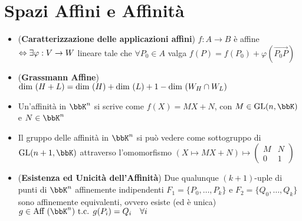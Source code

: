 \documentclass[a4paper,NoNotes,GeneralMath]{stdmdoc}
\begin{document}
	\section*{Spazi Affini e Affinità}
	\begin{itemize}
		\item ({\bf Caratterizzazione delle applicazioni affini}) $f: A \rightarrow B$ è affine $\Leftrightarrow \exists \varphi: V \rightarrow W$ lineare tale che $\forall P_0 \in A$ valga $f(P) = f(P_0) + \varphi(\overrightarrow{P_0P})$
		\item ({\bf Grassmann Affine}) $\mbox{dim }(H+L) = \mbox{dim }(H) + \mbox{dim }(L) + 1 - \mbox{dim }(W_H \cap W_L)$
		\item Un'affinità in $\bbK^n$ si scrive come $f(X) = MX+N$, con $M \in \GL(n, \bbK)$ e $N \in \bbK^n$
		\item Il gruppo delle affinità in $\bbK^n$ si può vedere come sottogruppo di $\GL(n+1, \bbK)$ attraverso l'omomorfismo $(X \mapsto MX + N) \mapsto \left( \begin{array}{c|c} M & N \\ \hline 0 & 1 \end{array} \right)$
		\item ({\bf Esistenza ed Unicità dell'Affinità}) Due qualunque $(k+1)$-uple di punti di $\bbK^n$ affinemente indipendenti $F_1=\{P_0, \ldots, P_k\}$ e $F_2 = \{Q_0, \ldots, Q_k\}$ sono affinemente equivalenti, ovvero esiste (ed è unica) $g \in \Aff(\bbK^n) \tc g(P_i) = Q_i \quad \forall i$
	\end{itemize}
\end{document}
